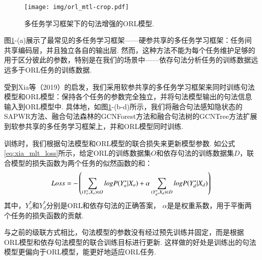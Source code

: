 \begin{figure}[hb!]
    \centering
    \texttt{[image: img/orl\_mtl-crop.pdf]}
    \caption{多任务学习框架下的句法增强的ORL模型. }
    \label{fig:orl_mtl}
\end{figure}

图\ref{fig:orl_mtl}-(a)展示了最常见的多任务学习框架——硬参共享的多任务学习框架：任务间共享编码层，并且独立各自的输出层.
然而，这种方法不能为每个任务维护足够的用于区分彼此的参数，特别是在我们的场景中——依存句法分析任务的训练数据远远多于ORL任务的训练数据.

受到Xia等（2019）的启发，我们采用软参共享的多任务学习框架来同时训练句法模型和ORL模型：保持各个任务的参数完全独立，并将句法模型输出的句法信息输入到ORL模型中.
具体地，如图\ref{fig:orl_mtl}-(b-d)所示，我们将融合句法感知隐状态的SAPWR方法、融合句法森林的GCNForest方法和融合句法树的GCNTree方法扩展到软参共享的多任务学习框架上，并和ORL模型同时训练.

训练时，我们根据句法模型和ORL模型的联合损失来更新模型参数. 如公式\ref{eq:xia_mlt_loss}所示，给定ORL的训练数据集$O$和依存句法的训练数据集$D$，联合模型的损失函数为两个任务的似然函数的和：
\begin{equation}
    \setlength{\abovedisplayskip}{9pt}
    \setlength{\belowdisplayskip}{9pt}
    \label{eq:xia_mlt_loss}
    Loss = -\left(\sum_{(Y_o^*,X_o) \in O} log P(Y_o^*|X_o) + \alpha \sum_{(Y_d^*,X_d) \in D} log P(Y_d^*|X_d) \right)
\end{equation}
其中，$Y_o^*$和$Y_d^*$分别是ORL和依存句法的正确答案， $\alpha$是是权重系数，用于平衡两个任务的损失函数的贡献.

与之前的级联方式相比，句法模型的参数没有经过预先训练并固定，而是根据ORL模型和依存句法模型的联合训练目标进行更新. 这样做的好处是训练出的句法模型更偏向于ORL模型，能更好地适应ORL任务.

